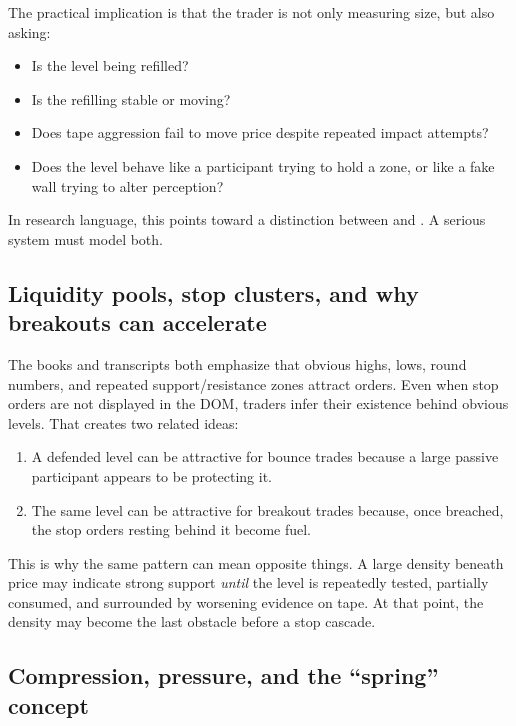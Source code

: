 The practical implication is that the trader is not only measuring size, but also asking:

\begin{itemize}[leftmargin=1.5em]
\item Is the level being refilled?
\item Is the refilling stable or moving?
\item Does tape aggression fail to move price despite repeated impact attempts?
\item Does the level behave like a participant trying to hold a zone, or like a fake wall trying to alter perception?
\end{itemize}

In research language, this points toward a distinction between  and . A serious system must model both.

\subsection{Liquidity pools, stop clusters, and why breakouts can accelerate}

The books and transcripts both emphasize that obvious highs, lows, round numbers, and repeated support/resistance zones attract orders. Even when stop orders are not displayed in the DOM, traders infer their existence behind obvious levels. That creates two related ideas:

\begin{enumerate}[leftmargin=1.5em]
\item A defended level can be attractive for bounce trades because a large passive participant appears to be protecting it.
\item The same level can be attractive for breakout trades because, once breached, the stop orders resting behind it become fuel.
\end{enumerate}

This is why the same pattern can mean opposite things. A large density beneath price may indicate strong support \emph{until} the level is repeatedly tested, partially consumed, and surrounded by worsening evidence on tape. At that point, the density may become the last obstacle before a stop cascade.

\subsection{Compression, pressure, and the ``spring'' concept}


